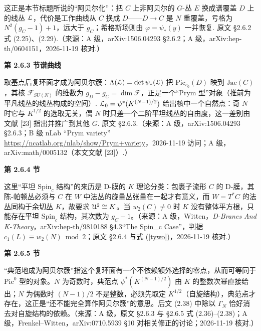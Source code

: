 \begin{description}[leftmargin=5.8em,labelwidth=5em,labelsep=0.6em,itemsep=0.15ex,topsep=0.2ex]
\item[2.6.2-1] 这正是本节标题所说的“阿贝尔化”：把 $C$ 上非阿贝尔的 $G$-丛 $E$ 换成谱覆盖 $D$ 上的线丛 ${\cal L}$，代价是工作曲线从 $C$ 换成 $D$——$D\to C$ 是 $N$ 重覆盖，亏格为 $N^2(g_C-1)+1$，远大于 $g_C$；希格斯场则由 $\varphi=\psi_*(y)$ 一并恢复. 原文 §2.6.2 式 (2.25)、(2.29).（来源：A 级，arXiv:1506.04293 §2.6.2；A 级，arXiv:hep-th/0604151，2026-11-19 核对.）
\end{description}
\medskip\noindent\textbf{第 2.6.3 节\quad 谱曲线}\par\nopagebreak
\begin{description}[leftmargin=5.8em,labelwidth=5em,labelsep=0.6em,itemsep=0.15ex,topsep=0.2ex]
\item[2.6.3-1] 取基点后复环面才成为阿贝尔簇：$\Lambda({\cal L})=\det\psi_*({\cal L})$ 把 $\mathrm{Pic}_{c_0}(D)$ 映到 $\mathrm{Jac}(C)$，其核 $\mathcal F_{SU(N)}$ 的维数为 $g_D-g_C=\dim\mathcal F$，正是一个“Prym 型”对象（推前为平凡线丛的线丛构成的空间）. ${\cal L}_0=\psi^*(K^{(N-1)/2})$ 给出核中一个自然点：奇 $N$ 时它与 $K^{1/2}$ 的选取无关，偶 $N$ 时只差一个二阶平坦线丛的自由度，这一差别由文献 [23] 指出并推广到其他 $G$. 原文 §2.6.3.（来源：A 级，arXiv:1506.04293 §2.6.3；B 级 nLab “Prym variety” \url{https://ncatlab.org/nlab/show/Prym+variety}，2026-11-19 访问；A 级，arXiv:math/0005132（本文文献 [23]）.）
\end{description}
\medskip\noindent\textbf{第 2.6.4 节\quad }\par\nopagebreak
\begin{description}[leftmargin=5.8em,labelwidth=5em,labelsep=0.6em,itemsep=0.15ex,topsep=0.2ex]
\item[2.6.4-1] 这里“平坦 ${\mathrm{Spin}_c}$ 结构”的来历是 D-膜的 $K$ 理论分类：包裹子流形 $C$ 的 D-膜，其陈-帕顿丛必须与 $C$ 在 $W$ 中法丛的旋量丛张量在一起才有意义，而 $W=T^*C$ 的法丛同构于余切丛 $K$，故要求 ${\mathcal U}^2\cong K$。当 $w_2(C)\neq0$ 时 $K$ 没有整体平方根，只能存在平坦 ${\mathrm{Spin}_c}$ 结构，其次数为 $g_C-1$。（来源：A 级，Witten，\emph{D-Branes And K-Theory}，arXiv:hep-th/9810188 §4.3“The Spin\_c Case”，判据 $c_1(L)\equiv w_2(N)\bmod 2$；原文 §2.6.4 与式 (\ref{tywo})，2026-11-19 核对.）
\end{description}
\medskip\noindent\textbf{第 2.6.5 节\quad }\par\nopagebreak
\begin{description}[leftmargin=5.8em,labelwidth=5em,labelsep=0.6em,itemsep=0.15ex,topsep=0.2ex]
\item[2.6.5-1] “典范地成为阿贝尔簇”指这个复环面有一个不依赖额外选择的零点，从而可等同于 $\mathrm{Pic}^0$ 型的对象。$N$ 为奇数时，典范点 $\psi^*(K^{(N-1)/2})$ 由 $K$ 的整数次幂直接给出；$N$ 为偶数时 $(N-1)/2$ 不是整数，必须先取定 $K^{1/2}$（自旋结构），典范点才存在，这正是“还不能完全算作阿贝尔簇”的意思。后文 (2.38) 中除以 $\Gamma_N$ 恰好消去对自旋结构的依赖。（来源：A 级，原文 §2.6.3 与 §2.6.5 式 (2.36)–(2.38)；A 级，Frenkel–Witten，arXiv:0710.5939 §10 对相关修正的讨论；2026-11-19 核对.）
\end{description}
